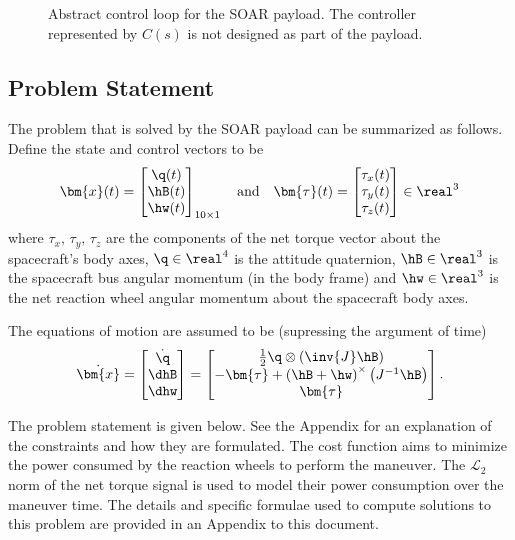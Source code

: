\documentclass[10pt]{article}
\begin{document}
\begin{figure}[bth]
\centering

\caption{Abstract control loop for the SOAR payload. The controller represented by $C(s)$ is not designed as part of the payload.}
\label{fig:SOAR_loop}
\end{figure}

\subsection{Problem Statement}

The problem that is solved by the SOAR payload can be summarized as follows. Define the state and control vectors to be
\begin{equation}
\bm{x}(t) = \begin{bmatrix}
\q(t) \\ \hB(t) \\ \hw(t)
\end{bmatrix}_{10\times 1} \quad \text{and} \quad \bm{\tau}(t) = \begin{bmatrix}
\tau_x(t) \\ \tau_y(t) \\ \tau_z(t)
\end{bmatrix} \in \real^3
\label{eq:state_control}
\end{equation}
where $\tau_x,\,\tau_y,\,\tau_z$ are the components of the net torque vector about the spacecraft's body axes, $\q\in\real^4$ is the attitude quaternion, $\hB\in\real^3$ is the spacecraft bus angular momentum (in the body frame) and $\hw\in\real^3$ is the net reaction wheel angular momentum about the spacecraft body axes. 

The equations of motion are assumed to be (supressing the argument of time)
\begin{equation}
\dot{\bm{x}} = \begin{bmatrix}
\dot{\q} \\ \dhB \\ \dhw
\end{bmatrix} = \begin{bmatrix}
\tfrac{1}{2} \q \otimes \left(\inv{J} \hB \right) \\
-\bm{\tau} + \left( \hB + \hw \right)^{\times} \left( J^{-1} \hB \right) \\
\bm{\tau}
\end{bmatrix}.
\label{eq:eqms}
\end{equation}

The problem statement is given below. See the Appendix for an explanation of the constraints and how they are formulated. The cost function aims to minimize the power consumed by the reaction wheels to perform the maneuver. The $\mathcal{L}_2$ norm of the net torque signal is used to model their power consumption over the maneuver time. The details and specific formulae used to compute solutions to this problem are provided in an Appendix to this document.
\end{document}
